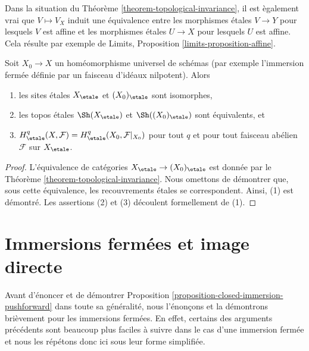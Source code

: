 \begin{remark}
\label{remark-affine-inside-equivalence}
Dans la situation du
Th\'eor\`eme \ref{theorem-topological-invariance},
il est \`egalement vrai que $V \mapsto V_X$ induit une \'equivalence
entre les morphismes \'etales $V \to Y$ pour lesquels $V$ est affine et
les morphismes \'etales $U \to X$ pour lesquels $U$ est affine.
Cela r\'esulte par exemple de
Limits, Proposition \ref{limits-proposition-affine}.
\end{remark}

\begin{proposition}
\label{proposition-topological-invariance}
Soit $X_0 \to X$ un hom\'eomorphisme universel de sch\'emas
(par exemple l'immersion ferm\'ee d\'efinie par un faisceau d'id\'eaux nilpotent).
Alors
\begin{enumerate}
\item les sites \'etales $X_\etale$ et $(X_0)_\etale$ sont isomorphes,
\item les topos \'etales $\Sh(X_\etale)$ et $\Sh((X_0)_\etale)$
sont \'equivalents, et
\item $H^q_\etale(X, \mathcal{F}) = H^q_\etale(X_0, \mathcal{F}|_{X_0})$
pour tout $q$ et
pour tout faisceau ab\'elien $\mathcal{F}$ sur $X_\etale$.
\end{enumerate}
\end{proposition}

\begin{proof}
L'\'equivalence de cat\'egories $X_\etale \to (X_0)_\etale$ est
donn\'ee par le Th\'eor\`eme \ref{theorem-topological-invariance}. Nous omettons
de d\'emontrer que, sous cette \'equivalence, les recouvrements \'etales se correspondent.
Ainsi, (1) est d\'emontr\'e. Les assertions (2) et (3) d\'ecoulent formellement de (1).
\end{proof}






\section{Immersions ferm\'ees et image directe}
\label{section-closed-immersions}

\noindent
Avant d'\'enoncer et de d\'emontrer
Proposition \ref{proposition-closed-immersion-pushforward}
dans toute sa g\'en\'eralit\'e, nous l'\'enon\c{c}ons et la d\'emontrons bri\`evement pour les
immersions ferm\'ees. En effet, certains des arguments pr\'ec\'edents
sont beaucoup plus faciles \`a suivre dans le cas d'une immersion ferm\'ee et
nous les r\'ep\'etons donc ici sous leur forme simplifi\'ee.

